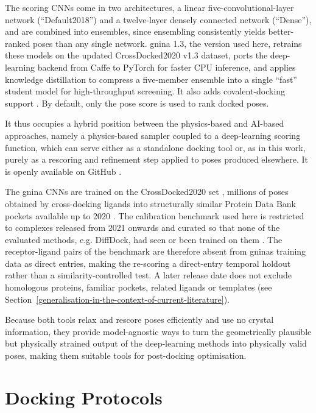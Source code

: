 The scoring CNNs come in two architectures, a linear five-convolutional-layer network (``Default2018'') and a twelve-layer densely connected network (``Dense''), and are combined into ensembles, since ensembling consistently yields better-ranked poses than any single network. gnina 1.3, the version used here, retrains these models on the updated CrossDocked2020 v1.3 dataset, ports the deep-learning backend from Caffe to PyTorch for faster CPU inference, and applies knowledge distillation to compress a five-member ensemble into a single ``fast'' student model for high-throughput screening. It also adds covalent-docking support \cite{ref067}. By default, only the pose score is used to rank docked poses.

It thus occupies a hybrid position between the physics-based and AI-based approaches, namely a physics-based sampler coupled to a deep-learning scoring function, which can serve either as a standalone docking tool or, as in this work, purely as a rescoring and refinement step applied to poses produced elsewhere. It is openly available on GitHub \cite{ref058}.

The gnina CNNs are trained on the CrossDocked2020 set \cite{ref059}, millions of poses obtained by cross-docking ligands into structurally similar Protein Data Bank pockets available up to 2020 \cite{ref056}. The calibration benchmark used here is restricted to complexes released from 2021 onwards and curated so that none of the evaluated methods, e.g. DiffDock, had seen or been trained on them \cite{ref035}. The receptor-ligand pairs of the benchmark are therefore absent from gnina\textquotesingle s training data as direct entries, making the re-scoring a direct-entry temporal holdout rather than a similarity-controlled test. A later release date does not exclude homologous proteins, familiar pockets, related ligands or templates (see Section~\ref{generalisation-in-the-context-of-current-literature}).

Because both tools relax and rescore poses efficiently and use no crystal information, they provide model-agnostic ways to turn the geometrically plausible but physically strained output of the deep-learning methods into physically valid poses, making them suitable tools for post-docking optimisation.

\hypertarget{docking-protocols}{%
\chapter{Docking Protocols}\label{docking-protocols}}

